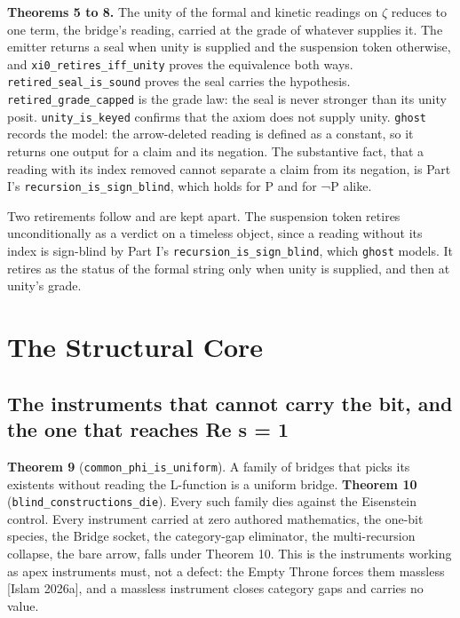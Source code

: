 \documentclass[10pt]{article}
\begin{document}
\textbf{Theorems 5 to 8.} The unity of the formal and kinetic readings
on \(\zeta\) reduces to one term, the bridge's reading, carried at the
grade of whatever supplies it. The emitter returns a seal when unity is
supplied and the suspension token otherwise, and
\texttt{xi0\_retires\_iff\_unity} proves the equivalence both ways.
\texttt{retired\_seal\_is\_sound} proves the seal carries the
hypothesis. \texttt{retired\_grade\_capped} is the grade law: the seal
is never stronger than its unity posit. \texttt{unity\_is\_keyed}
confirms that the axiom does not supply unity. \texttt{ghost} records
the model: the arrow-deleted reading is defined as a constant, so it
returns one output for a claim and its negation. The substantive fact,
that a reading with its index removed cannot separate a claim from its
negation, is Part I's \texttt{recursion\_is\_sign\_blind}, which holds
for P and for ¬P alike.

Two retirements follow and are kept apart. The suspension token retires
unconditionally as a verdict on a timeless object, since a reading
without its index is sign-blind by Part I's
\texttt{recursion\_is\_sign\_blind}, which \texttt{ghost} models. It
retires as the status of the formal string only when unity is supplied,
and then at unity's grade.

\hypertarget{the-structural-core}{%
\section{The Structural Core}\label{the-structural-core}}

\hypertarget{the-instruments-that-cannot-carry-the-bit-and-the-one-that-reaches-re-s-1}{%
\subsection{The instruments that cannot carry the bit, and the one that
reaches Re s =
1}\label{the-instruments-that-cannot-carry-the-bit-and-the-one-that-reaches-re-s-1}}

\textbf{Theorem 9} (\texttt{common\_phi\_is\_uniform}). A family of
bridges that picks its existents without reading the L-function is a
uniform bridge. \textbf{Theorem 10}
(\texttt{blind\_constructions\_die}). Every such family dies against the
Eisenstein control. Every instrument carried at zero authored
mathematics, the one-bit species, the Bridge socket, the category-gap
eliminator, the multi-recursion collapse, the bare arrow, falls under
Theorem 10. This is the instruments working as apex instruments must,
not a defect: the Empty Throne forces them massless {[}Islam 2026a{]},
and a massless instrument closes category gaps and carries no value.
\end{document}
